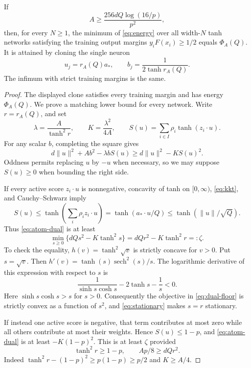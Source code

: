 \begin{theorem}\label{thm:scalar}
If
\begin{equation}\label{eq:A-threshold}
 A\ge \frac{256dQ\log(16/p)}{p^2},
\end{equation}
then, for every $N\ge1$, the minimum of \eqref{eq:energy} over all
width-$N$ tanh networks satisfying the training output margins
$y_iF(x_i)\ge1/2$ equals $\Phi_A(Q)$. It is attained by cloning the
single neuron
\[
 u_j=r_A(Q)a_*,\qquad b_j=\frac1{2\tanh r_A(Q)}.
\]
The infimum with strict training margins is the same.
\end{theorem}
\begin{proof}
The displayed clone satisfies every training margin and has energy
$\Phi_A(Q)$. We prove a matching lower bound for every network.
Write $r=r_A(Q)$, and set
\[
 \lambda=\frac A{\tanh^2r},\qquad K=\frac{\lambda^2}{4A},\qquad
 S(u)=\sum_{i\in I}\rho_i\tanh(z_i\cdot u).
\]
For any scalar $b$, completing the square gives
\begin{equation}\label{eq:atom-dual}
 d\|u\|^2+Ab^2-\lambda bS(u)
 \ge d\|u\|^2-KS(u)^2.
\end{equation}
Oddness permits replacing $u$ by $-u$ when necessary, so we may suppose
$S(u)\ge0$ when bounding the right side.

If every active score $z_i\cdot u$ is nonnegative, concavity of tanh on
$[0,\infty)$, \eqref{eq:kkt}, and Cauchy--Schwarz imply
\begin{equation}\label{eq:good-atom}
 S(u)\le\tanh\!\left(\sum_i\rho_i z_i\cdot u\right)
 =\tanh(a_*\cdot u/Q)
 \le\tanh(\|u\|/\sqrt Q).
\end{equation}
Thus \eqref{eq:atom-dual} is at least
\begin{equation}\label{eq:dual-floor}
 \min_{s\ge0}\{dQs^2-K\tanh^2s\}
 =dQr^2-K\tanh^2r=:\zeta.
\end{equation}
To check the equality, $h(v)=\tanh^2\sqrt v$ is strictly concave for
$v>0$. Put $s=\sqrt v$. Then $h'(v)=\tanh(s)\operatorname{sech}^2(s)/s$.
The logarithmic derivative of this expression with respect to $s$ is
\[
 \frac1{\sinh s\cosh s}-2\tanh s-\frac1s<0.
\]
Here $\sinh s\cosh s>s$ for $s>0$.
Consequently the objective in \eqref{eq:dual-floor} is strictly convex
as a function of $s^2$, and \eqref{eq:stationary} makes $s=r$ stationary.

If instead one active score is negative, that term contributes at most
zero while all others contribute at most their weights. Hence
$S(u)\le1-p$, and \eqref{eq:atom-dual} is at least $-K(1-p)^2$.
This is at least $\zeta$ provided
\begin{equation}\label{eq:saturation-conditions}
 \tanh^2r\ge1-p,\qquad Ap/8\ge dQr^2.
\end{equation}
Indeed $\tanh^2r-(1-p)^2\ge p(1-p)\ge p/2$ and $K\ge A/4$.


\end{proof}
